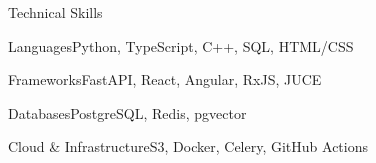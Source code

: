 \documentclass[
	11pt
]{../../../template}
\begin{document}
	\begin{rSection}{T}{echnical Skills}
		\begin{rSet}{Languages}{Python, TypeScript, C++, SQL, HTML/CSS}
		\end{rSet}
		\begin{rSet}{Frameworks}{FastAPI, React, Angular, RxJS, JUCE}
		\end{rSet}
		\begin{rSet}{Databases}{PostgreSQL, Redis, pgvector}
		\end{rSet}
		\begin{rSet}{Cloud \& Infrastructure}{S3, Docker, Celery, GitHub Actions}
		\end{rSet}
	\end{rSection}
\end{document}
